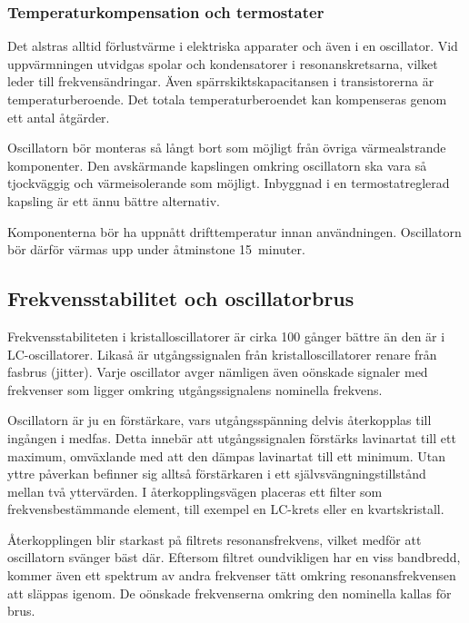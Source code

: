 \subsubsection{Temperaturkompensation och termostater}

Det alstras alltid förlustvärme i elektriska apparater och även i en oscillator.
Vid uppvärmningen utvidgas spolar och kondensatorer i resonanskretsarna,
vilket leder till frekvensändringar.
Även spärrskiktskapacitansen i transistorerna är temperaturberoende.
Det totala temperaturberoendet kan kompenseras genom ett antal åtgärder.

Oscillatorn bör monteras så långt bort som möjligt från övriga
värmealstrande komponenter.
Den avskärmande kapslingen omkring oscillatorn ska vara så tjockväggig och
värmeisolerande som möjligt.
Inbyggnad i en termostatreglerad kapsling är ett ännu bättre alternativ.

Komponenterna bör ha uppnått drifttemperatur innan användningen.
Oscillatorn bör därför värmas upp under åtminstone 15~minuter.

\subsection{Frekvensstabilitet och oscillatorbrus}

Frekvensstabiliteten i kristalloscillatorer är cirka 100 gånger bättre än
den är i LC-oscillatorer.
Likaså är utgångssignalen från kristalloscillatorer renare från fasbrus (jitter).
Varje oscillator avger nämligen även oönskade signaler med frekvenser som
ligger omkring utgångssignalens nominella frekvens.

Oscillatorn är ju en förstärkare, vars utgångsspänning delvis
återkopplas till ingången i medfas.
Detta innebär att utgångssignalen förstärks lavinartat till ett maximum,
omväxlande med att den dämpas lavinartat till ett minimum.
Utan yttre påverkan befinner sig alltså förstärkaren i ett
självsvängningstillstånd mellan två yttervärden.
I återkopplingsvägen placeras ett filter som frekvensbestämmande
element, till exempel en LC-krets eller en kvartskristall.

Återkopplingen blir starkast på filtrets resonansfrekvens, vilket
medför att oscillatorn svänger bäst där.
Eftersom filtret oundvikligen har en viss bandbredd, kommer även ett
spektrum av andra frekvenser tätt omkring resonansfrekvensen att släppas
igenom.
De oönskade frekvenserna omkring den nominella kallas för brus.


